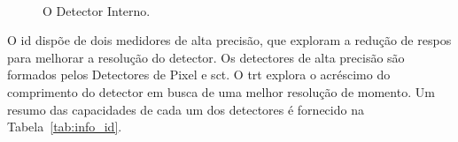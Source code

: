 \begin{figure}[h!t]
    \label{fig:det_interno}
    \begin{center}
        \\
    \end{center}
    \caption[O Detector Interno (ID)]{O Detector Interno.}%
\end{figure}

O \gls{id} dispõe de dois medidores de alta precisão, que exploram a redução 
de \gls{respos} para melhorar a resolução do detector. Os detectores de alta 
precisão são formados pelos Detectores de Pixel e \gls{sct}. O \gls{trt}
explora o acréscimo do \gls{comprimento} do detector em busca de uma melhor
resolução de momento. Um resumo das capacidades de
cada um dos detectores é fornecido na Tabela~\ref{tab:info_id}.

